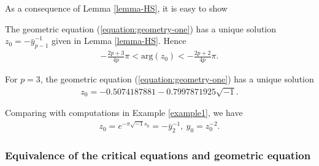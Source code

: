 \documentclass[12pt]{amsart}
\begin{document}
As a consequence of Lemma \ref{lemma-HS}, it is easy to show
\begin{proposition} \label{prop-geometricequation}
The geometric equation (\ref{equation:geometry-one}) has a unique solution $z_0=-\bar{y}_{p-1}^{-1}$ given in Lemma \ref{lemma-HS}. Hence 
\begin{align}
     -\frac{2p+3}{4p}\pi<\text{arg}(z_0)<-\frac{2p+2}{4p}\pi.
\end{align}
\end{proposition}
 
\begin{example}
For $p=3$, the geometric equation (\ref{equation:geometry-one}) has a unique solution 
\begin{align}
z_0=-0.5074187881-0.7997871925\sqrt{-1}.
\end{align}
\end{example}
Comparing with computations in Example \ref{example1}, we have 
\begin{align}
z_0=e^{-\pi\sqrt{-1}s_0}=-\bar{y}_2^{-1}, \  y_0=z_0^{-2}.   
\end{align}





\subsubsection{Equivalence of the critical equations and geometric equation}
\end{document}
